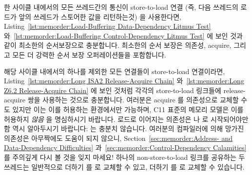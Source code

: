 한 사이클 내에서의 모든 쓰레드간의 통신이 store-to-load 연결 (즉, 다음 쓰레드의
로드가 앞의 쓰레드가 스토어한 값을 리턴하는것) 을 사용한다면,
Listing~\ref{lst:memorder:Load-Buffering Data-Dependency Litmus Test}
와~\ref{lst:memorder:Load-Buffering Control-Dependency Litmus Test} 에 보인
것과 같이 최소한의 순서보장으로 충분합니다.
최소한의 순서 보장은 의존성, acquire, 그리고 모든 더 강력한 순서 보장
오퍼레이션들을 포함합니다.

해당 사이클 내에서의 하나를 제외한 모든 연결들이 store-to-load 연결이라면,
Listing~\ref{lst:memorder:Long ISA2 Release-Acquire Chain}
와~\ref{lst:memorder:Long Z6.2 Release-Acquire Chain} 에 보인 것처럼 각각의
store-to-load 링크들에 release-acquire 쌍을 사용하는 것으로 충분합니다.
여러분은 acquire 를 의존성으로 교체할 수도 있지만 이는 이를 허용하는 환경에서만
가능하며, C11 표준의 메모리 모델은 이를 허용하지 \emph{않음} 을 명심하시기
바랍니다.
로드로 이어지는 의존성은  나 
로 시작되어야만 함 역시 알아두시기 바랍니다:
 는 충분치 않습니다.
여러분의 컴파일러에 의해 망가진 의존성은 아무짝에도 도움이 되지 않으니,
Section~\ref{sec:memorder:Address- and Data-Dependency Difficulties}
과~\ref{sec:memorder:Control-Dependency Calamities} 를 주의깊게 다시 볼 것을 잊지 마세요!
하나의 non-store-to-load 링크를 공유하는 두 쓰레드는 일반적으로
 더하기  를  로 교체할
수 있고,  더하기  를  로
교체할 수 있습니다.
\iffalse

